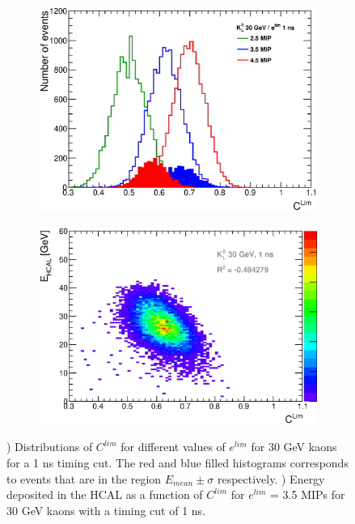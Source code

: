 \begin{figure}[htbp!]
  \centering
  \begin{subfigure}[t]{0.49\textwidth}
    \centering
    \includegraphics[width=1\linewidth]{../Thesis_Plots/ILD/AdditionalPlots/Plots/CLim_1ns_30GeV.eps}
    \caption{} \label{fig:CLim30_1ns}
  \end{subfigure}
  \hfill
  \begin{subfigure}[t]{0.49\textwidth}
    \centering
    \includegraphics[width=1\linewidth]{../Thesis_Plots/ILD/AdditionalPlots/Plots/EhcalCLim_1ns_30GeV.eps}
    \caption{} \label{fig:EhcalCLim30_1ns}
  \end{subfigure}
  \caption{) Distributions of $C^{lim}$ for different values of $e^{lim}$ for 30 GeV kaons for a 1 ns timing cut. The red and blue filled histograms corresponds to events that are in the region $E_{mean} \pm \sigma$ respectively. ) Energy deposited in the HCAL as a function of $C^{lim}$ for $e^{lim}$ = 3.5 MIPs for 30 GeV kaons with a timing cut of 1 ns.}
\end{figure}
